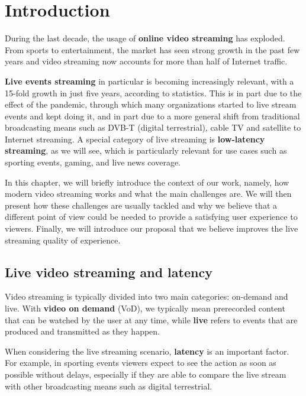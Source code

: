 \chapter{Introduction}
\label{cha:intro}

During the last decade, the usage of \textbf{online video streaming} has exploded. From sports to entertainment, the market has seen strong growth in the past few years and video streaming now accounts for more than half of Internet traffic.\cite{cisco2019}

\textbf{Live events streaming} in particular is becoming increasingly relevant, with a 15-fold growth in just five years, according to statistics. This is in part due to the effect of the pandemic, through which many organizations started to live stream events and kept doing it, and in part due to a more general shift from traditional broadcasting means such as DVB-T (digital terrestrial), cable TV and satellite to Internet streaming. A special category of live streaming is \textbf{low-latency streaming}, as we will see, which is particularly relevant for use cases such as sporting events, gaming, and live news coverage.

In this chapter, we will briefly introduce the context of our work, namely, how modern video streaming works and what the main challenges are. We will then present how these challenges are usually tackled and why we believe that a different point of view could be needed to provide a satisfying user experience to viewers. Finally, we will introduce our proposal that we believe improves the live streaming quality of experience.

\section{Live video streaming and latency}
\label{sec:intro/live}

Video streaming is typically divided into two main categories: on-demand and live. With \textbf{video on demand} (VoD), we typically mean prerecorded content that can be watched by the user at any time, while \textbf{live} refers to events that are produced and transmitted as they happen.

When considering the live streaming scenario, \textbf{latency} is an important factor. For example, in sporting events viewers expect to see the action as soon as possible without delays, especially if they are able to compare the live stream with other broadcasting means such as digital terrestrial.

